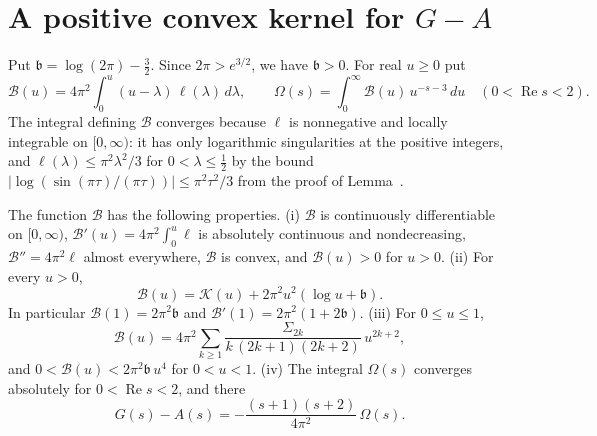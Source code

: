 \section{A positive convex kernel for $G-A$}\label{sec:B}

Put $\mathfrak b=\log(2\pi)-\frac32$. Since $2\pi>e^{3/2}$, we have $\mathfrak b>0$. For real $u\ge0$ put
\begin{equation}\label{eq:Bdef}
\mathcal B(u)=4\pi^2\int_0^u(u-\lambda)\,\ell(\lambda)\,d\lambda,\qquad\Omega(s)=\int_0^\infty\mathcal B(u)\,u^{-s-3}\,du\quad(0<\operatorname{Re}s<2).
\end{equation}
The integral defining $\mathcal B$ converges because $\ell$ is nonnegative and locally integrable on $[0,\infty)$: it has only logarithmic singularities at the positive integers, and $\ell(\lambda)\le\pi^2\lambda^2/3$ for $0<\lambda\le\frac12$ by the bound $|\log(\sin(\pi\tau)/(\pi\tau))|\le\pi^2\tau^2/3$ from the proof of Lemma~.

\begin{proposition}\label{prop:B}
The function $\mathcal B$ has the following properties.
\textup{(i)} $\mathcal B$ is continuously differentiable on $[0,\infty)$, $\mathcal B'(u)=4\pi^2\int_0^u\ell$ is absolutely continuous and nondecreasing, $\mathcal B''=4\pi^2\ell$ almost everywhere, $\mathcal B$ is convex, and $\mathcal B(u)>0$ for $u>0$.
\textup{(ii)} For every $u>0$,
\begin{equation}\label{eq:BK}
\mathcal B(u)=\mathcal K(u)+2\pi^2u^2(\log u+\mathfrak b).
\end{equation}
In particular $\mathcal B(1)=2\pi^2\mathfrak b$ and $\mathcal B'(1)=2\pi^2(1+2\mathfrak b)$.
\textup{(iii)} For $0\le u\le1$,
\begin{equation}\label{eq:Bseries}
\mathcal B(u)=4\pi^2\sum_{k\ge1}\frac{\Sigma_{2k}}{k\,(2k+1)(2k+2)}\,u^{2k+2},
\end{equation}
and $0<\mathcal B(u)<2\pi^2\mathfrak b\,u^4$ for $0<u<1$.
\textup{(iv)} The integral $\Omega(s)$ converges absolutely for $0<\operatorname{Re}s<2$, and there
\begin{equation}\label{eq:GAOmega}
G(s)-A(s)=-\frac{(s+1)(s+2)}{4\pi^2}\,\Omega(s).
\end{equation}
\end{proposition}


